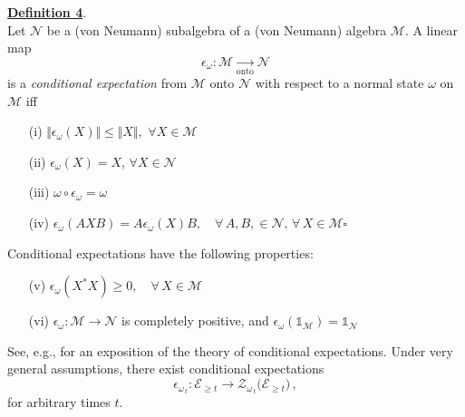 \documentclass[a4paper,11pt]{article}
\begin{document}
\begin{enumerate}
{ \underline{\bf{Definition 4}}. \\
 Let $\mathcal{N}$ be a (von Neumann) subalgebra of a (von Neumann) algebra $\mathcal{M}$. A linear map 
 \begin{equation} \label{condexp}
 \epsilon_{\omega} : \mathcal{M} \underset{\text{onto}}{\rightarrow} \mathcal{N}
 \end{equation}
 is a \textit{conditional expectation} from $\mathcal{M}$ onto $\mathcal{N}$ with respect to a normal state $\omega$ on 
 $\mathcal{M}$ iff
\begin{enumerate}
\item[(i)]{$\Vert \epsilon_{\omega} (X) \Vert \leq \Vert X \Vert,$ \quad $\forall X \in \mathcal{M}$}
\item[(ii)]{ $\epsilon_{\omega}(X) = X$, \quad $\forall X \in \mathcal{N}$}
\item[(iii)]{ $\omega \circ \epsilon_{\omega} = \omega$} 
\item[(iv)]{$\epsilon_{\omega}(AXB)= A \epsilon_{\omega}(X) B, \quad \forall \, A, B, \in \mathcal{N}, \, \forall \, X \in \mathcal{M}$}\hspace{2.8cm}$\square$
 \end{enumerate}

Conditional expectations have the following properties:
\begin{enumerate}
\item[(v)]{$ \epsilon_{\omega}(X^{*}X) \geq 0, \quad \forall \,X \in \mathcal{M}$}
\item[(vi)]{$\epsilon_{\omega} : \mathcal{M} \rightarrow \mathcal{N}$ is completely positive, and 
$\epsilon_{\omega}({\mathds{1}}_{\mathcal{M}})= {\mathds{1}}_{\mathcal{N}}$}
\end{enumerate}
 See, e.g., \cite{Takesaki} for an exposition of the theory of conditional expectations. Under very general assumptions, there exist conditional expectations
 \begin{equation}\label{condexp}
\epsilon_{\omega_{\,t}}: \mathcal{E}_{\geq t} \rightarrow \mathcal{Z}_{\omega_{\,t}}\big(\mathcal{E}_{\geq t}\big)\,,
\end{equation}
 for arbitrary times $t$.
 
}
\end{enumerate}
\end{document}
